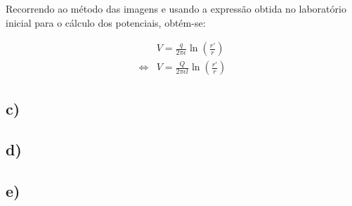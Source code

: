 \documentclass[portuguese, a4paper, titlepage]{article}
\newcommand{\eq}{\Leftrightarrow} %
\begin{document}
	Recorrendo ao método das imagens e usando a expressão obtida no laboratório inicial para o cálculo dos potenciais, obtém-se:
	
	\begin{align*}
		&V =  \frac{q}{2\pi\epsilon} \ln\left(\frac{r'}{r}\right) \\
		\eq &V = \frac{Q}{2\pi\epsilon l} \ln\left(\frac{r'}{r}\right)
	\end{align*}

	\subsection{c)}

	\subsection{d)}

	\subsection{e)}


\end{document}
